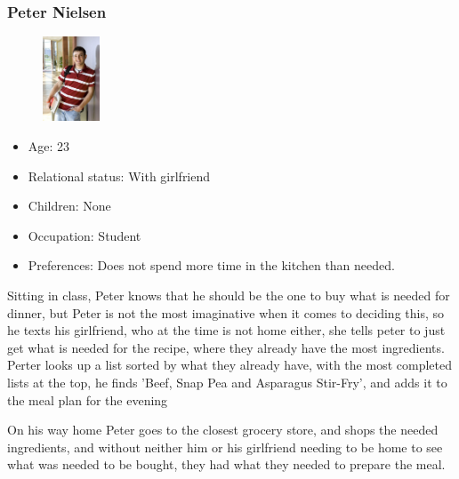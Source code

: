 \subsubsection{Peter Nielsen}	\label{PersonaPeterNielsen}
\begin{figure}[H]
	\includegraphics[width=0.15\textwidth]{Grafik/FoodPlanner/PersonaPeterNielsen}
\end{figure}
\begin{itemize}
	\item Age: 23
	\item Relational status: With girlfriend
	\item Children: None
	\item Occupation: Student
	\item Preferences: Does not spend more time in the kitchen than needed.
\end{itemize}
Sitting in class, Peter knows that he should be the one to buy what is needed for dinner, but Peter is not the most imaginative when it comes to deciding this, so he texts his girlfriend, who at the time is not home either, she tells peter to just get what is needed for the recipe, where they already have the most ingredients. Perter looks up a list sorted by what they already have, with the most completed lists at the top, he finds 'Beef, Snap Pea and Asparagus Stir-Fry', and adds it to the meal plan for the evening

On his way home Peter goes to the closest grocery store, and shops the needed ingredients, and without neither him or his girlfriend needing to be home to see what was needed to be bought, they had what they needed to prepare the meal.

